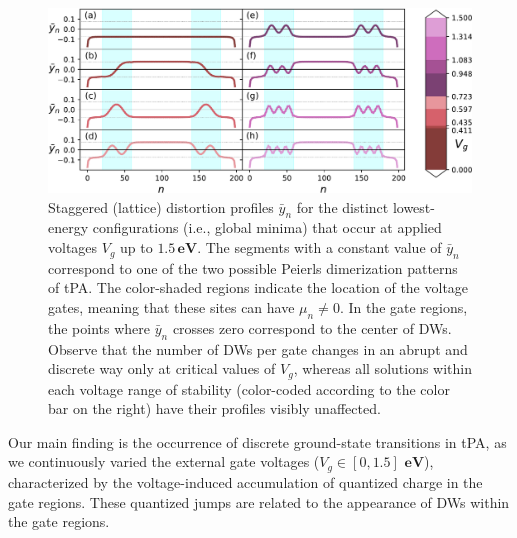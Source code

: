 \documentclass[10pt,a4paper]{article}
\begin{document}
\begin{figure}[t]
    \centering
    \includegraphics[scale=0.7]{figures/DWs.pdf}
    \caption{Staggered (lattice) distortion profiles $\bar{y}_{n}$ for the distinct lowest-energy configurations (i.e., global minima) that occur at applied voltages $V_{g}$ up to $1.5 \, \textbf{eV}$. The segments with a constant value of $\bar{y}_{n}$ correspond to one of the two possible Peierls dimerization patterns of tPA. The color-shaded regions indicate the location of the voltage gates, meaning that these sites can have ${\mu_{n} \ne 0}$. In the gate regions, the points where $\bar{y}_{n}$ crosses zero correspond to the center of DWs. Observe that the number of DWs per gate changes in an abrupt and discrete way only at critical values of $V_{g}$, whereas all solutions within each voltage range of stability (color-coded according to the color bar on the right) have their profiles visibly unaffected. }
    \label{fig:DWs}
\end{figure}

Our main finding is the occurrence of discrete ground-state transitions in tPA, as we continuously varied the external gate voltages (${V_{g} \in[0,1.5] \,\, \textbf{eV}}$), characterized by the voltage-induced accumulation of quantized charge in the gate regions. These quantized jumps are related to the appearance of DWs within the gate regions.
\end{document}
